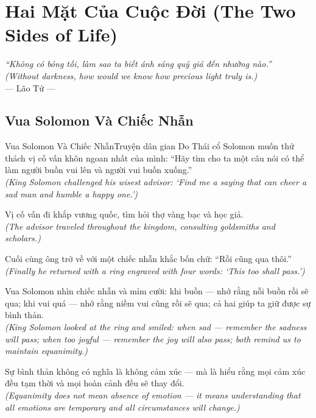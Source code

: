 \chapter{Hai Mặt Của Cuộc Đời (The Two Sides of Life)}
\begin{center}
  \textit{\color{truyengold}``Không có bóng tối, làm sao ta biết ánh sáng quý giá đến nhường nào.''}\\[4pt]
  \textit{(Without darkness, how would we know how precious light truly is.)}\\[4pt]
  \small\color{truyenblue}--- Lão Tử ---
\end{center}
\ngancach

\section{Vua Solomon Và Chiếc Nhẫn}
\begin{truyen}{Vua Solomon Và Chiếc Nhẫn}{Truyện dân gian Do Thái cổ}
 Solomon muốn thử thách vị cố vấn khôn ngoan nhất của mình: ``Hãy tìm cho ta một câu nói có thể làm người buồn vui lên và người vui buồn xuống.''\\[4pt]
\textit{(King Solomon challenged his wisest advisor: `Find me a saying that can cheer a sad man and humble a happy one.')}

Vị cố vấn đi khắp vương quốc, tìm hỏi thợ vàng bạc và học giả.\\[4pt]
\textit{(The advisor traveled throughout the kingdom, consulting goldsmiths and scholars.)}

Cuối cùng ông trở về với một chiếc nhẫn khắc bốn chữ: ``Rồi cũng qua thôi.''\\[4pt]
\textit{(Finally he returned with a ring engraved with four words: `This too shall pass.')}

Vua Solomon nhìn chiếc nhẫn và mỉm cười: khi buồn --- nhớ rằng nỗi buồn rồi sẽ qua; khi vui quá --- nhớ rằng niềm vui cũng rồi sẽ qua; cả hai giúp ta giữ được sự bình thản.\\[4pt]
\textit{(King Solomon looked at the ring and smiled: when sad --- remember the sadness will pass; when too joyful --- remember the joy will also pass; both remind us to maintain equanimity.)}

\end{truyen}
\begin{baihoc}
  Sự bình thản không có nghĩa là không cảm xúc --- mà là hiểu rằng mọi cảm xúc đều tạm thời và mọi hoàn cảnh đều sẽ thay đổi.\\[4pt]
  \textit{(Equanimity does not mean absence of emotion --- it means understanding that all emotions are temporary and all circumstances will change.)}
\end{baihoc}

